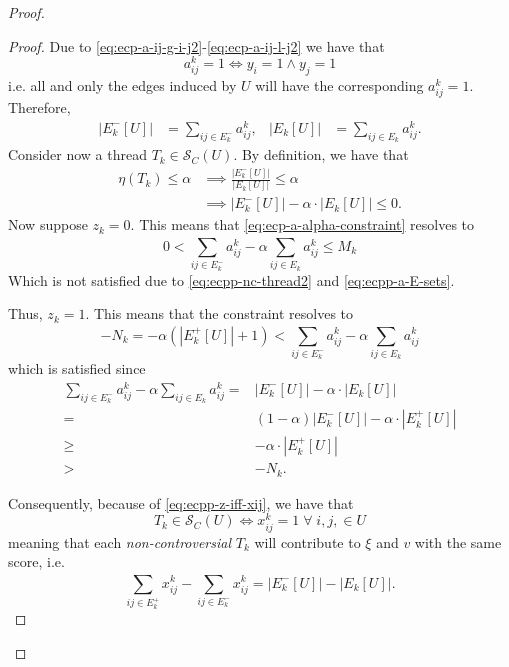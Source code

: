\begin{proof}
\begin{proof}
		Due to \eqref{eq:ecp-a-ij-g-i-j2}-\eqref{eq:ecp-a-ij-l-j2} we
		have that
		\begin{equation}
			a_{ij}^{k} = 1 \iff y_i = 1 \land y_j = 1
		\end{equation}
		i.e. all and only the edges induced by $U$ will have the corresponding
		$a_{ij}^{k} = 1$. Therefore,
		\begin{align}
			\label{eq:ecpp-a-E-sets}
			|E^{-}_{k}[U]| & = \sum^{}_{ij \in E^-_k} a_{ij}^{k}, &
			|E_{k}[U]|     & = \sum^{}_{ij \in E_k } a_{ij}^{k}.
		\end{align}
		Consider now a thread $T_k \in \mathcal{S}_C(U)$. By definition, we
		have that
		\begin{alignat}
			\eta(T_k) \leq \alpha & \implies \frac{|E^{-}_{k}[U]|}{|E_{k}[U]|} \leq \alpha \\
			\label{eq:ecpp-nc-thread2}
			                      & \implies |E^{-}_{k}[U]| - \alpha \cdot
			|E_{k}[U]| \leq 0.
		\end{alignat}
		Now suppose $z_k = 0$. This means that
		\eqref{eq:ecp-a-alpha-constraint} resolves to
		\begin{equation*}
			0 < \sum^{}_{ij \in E^-_k} a_{ij}^{k}  - \alpha \sum^{}_{ij
				\in E_k}
			a_{ij} ^{k} \leq M_{k}
		\end{equation*}
		Which is not satisfied due to \eqref{eq:ecpp-nc-thread2} and
		\eqref{eq:ecpp-a-E-sets}.

		Thus, $z_k = 1$. This
		means that the constraint resolves to
		\begin{equation*}
			-N_k = -\alpha (|E^{+}_{k}[U]| + 1)< \sum^{}_{ij \in E^-_k} a_{ij}^{k}  -
			\alpha \sum^{}_{ij \in E_k} a_{ij} ^{k}
		\end{equation*}
		which is satisfied since
		\begin{align}
			\sum^{}_{ij \in E^-_k} a_{ij}^{k}  - \alpha \sum^{}_{ij \in E_k}
			a_{ij} ^{k} = & |E^{-}_{k}[U]| - \alpha \cdot |E_{k}[U]|                \\
			=             & (1- \alpha)|E^{-}_{k}[U]| - \alpha \cdot |E^{+}_{k}[U]| \\
			\geq          & - \alpha \cdot |E^{+}_{k}[U]|                           \\
			>             & - N_k.
		\end{align}

		Consequently, because of \eqref{eq:ecpp-z-iff-xij}, we have that
		\begin{equation}
			T_k \in \mathcal{S}_C(U) \iff x_{ij}^{k} = 1 \; \forall \;i, j, \in U
		\end{equation}
		meaning that each \emph{non-controversial} $T_k$ will contribute to
		$\xi$ and $v$ with the same score, i.e.
		\begin{equation*}
			\sum^{}_{ij \in E^{+}_k } x_{ij}
				^{k} - \sum_{ij \in E^{-} _k} x_{ij} ^{k} = |E^{-}_{k}[U]| -
			|E_{k}[U]|.
		\end{equation*}


\end{proof}
\end{proof}
